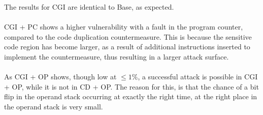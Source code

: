 The results for CGI are identical to Base, as expected.\\\\
CGI + PC shows a higher vulnerability with a fault in the program counter, compared to the code duplication countermeasure. This is because the sensitive code region has become larger, as a result of additional instructions inserted to implement the countermeasure, thus resulting in a larger attack surface.\\\\
As CGI + OP shows, though low at $\leq 1\%$, a successful attack is possible in CGI + OP, while it is not in CD + OP. The reason for this, is that the chance of a bit flip in the operand stack occurring at exactly the right time, at the right place in the operand stack is very small.